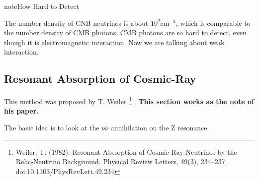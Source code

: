 \documentclass[letterpaper,12pt,english]{sphinxmanual}
\begin{document}
\begin{notice}{note}{How Hard to Detect}

The number density of CNB neutrinos is about \(10^2\mathrm{cm}^{-3}\), which is comparable to the number density of CMB photons. CMB photons are so hard to detect, even though it is electromagnetic interaction. Now we are talking about weak interaction.
\end{notice}


\subsection{Resonant Absorption of Cosmic-Ray}
\label{cosmology:resonant-absorption-of-cosmic-ray}
This method was proposed by T. Weiler \footnote[6]{
Weiler, T. (1982). Resonant Absorption of Cosmic-Ray Neutrinos by the Relic-Neutrino Background. Physical Review Letters, 49(3), 234–237. doi:10.1103/PhysRevLett.49.234
} . \textbf{This section works as the note of his paper.}

The basic idea is to look at the \(\nu \bar\nu\) annihilation on the Z resonance.
\end{document}
